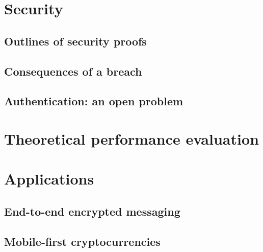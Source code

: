 	


\section{Security}
\label{sec:security}

	\subsection{Outlines of security proofs}

	\subsection{Consequences of a breach}
	
	\subsection{Authentication: an open problem}


\section{Theoretical performance evaluation}
\label{sec:performance}


\section{Applications}
\label{sec:applications}

	\subsection{End-to-end encrypted messaging}
	
	\subsection{Mobile-first cryptocurrencies}

